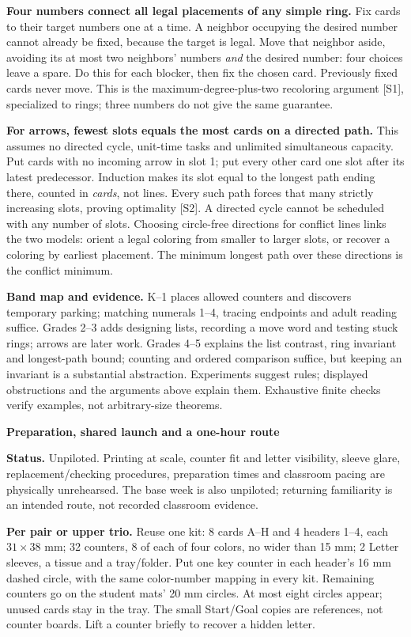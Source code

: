 \documentclass[10pt]{article}
\newcommand{\head}[1]{\par{\large\bfseries #1}\par}
\begin{document}
\textbf{Four numbers connect all legal placements of any simple ring.} Fix cards to their target numbers one at a time. A neighbor occupying the desired number cannot already be fixed, because the target is legal. Move that neighbor aside, avoiding its at most two neighbors' numbers \emph{and} the desired number: four choices leave a spare. Do this for each blocker, then fix the chosen card. Previously fixed cards never move. This is the maximum-degree-plus-two recoloring argument [S1], specialized to rings; three numbers do not give the same guarantee.

\textbf{For arrows, fewest slots equals the most cards on a directed path.} This assumes no directed cycle, unit-time tasks and unlimited simultaneous capacity. Put cards with no incoming arrow in slot 1; put every other card one slot after its latest predecessor. Induction makes its slot equal to the longest path ending there, counted in \emph{cards}, not lines. Every such path forces that many strictly increasing slots, proving optimality [S2]. A directed cycle cannot be scheduled with any number of slots. Choosing circle-free directions for conflict lines links the two models: orient a legal coloring from smaller to larger slots, or recover a coloring by earliest placement. The minimum longest path over these directions is the conflict minimum.

\textbf{Band map and evidence.} K--1 places allowed counters and discovers temporary parking; matching numerals 1--4, tracing endpoints and adult reading suffice. Grades 2--3 adds designing lists, recording a move word and testing stuck rings; arrows are later work. Grades 4--5 explains the list contrast, ring invariant and longest-path bound; counting and ordered comparison suffice, but keeping an invariant is a substantial abstraction. Experiments suggest rules; displayed obstructions and the arguments above explain them. Exhaustive finite checks verify examples, not arbitrary-size theorems.
\newpage
\head{Preparation, shared launch and a one-hour route}
\textbf{Status.} Unpiloted. Printing at scale, counter fit and letter visibility, sleeve glare, replacement/checking procedures, preparation times and classroom pacing are physically unrehearsed. The base week is also unpiloted; returning familiarity is an intended route, not recorded classroom evidence.

\textbf{Per pair or upper trio.} Reuse one kit: 8 cards A--H and 4 headers 1--4, each $31\times38$ mm; 32 counters, 8 of each of four colors, no wider than 15 mm; 2 Letter sleeves, a tissue and a tray/folder. Put one key counter in each header's 16 mm dashed circle, with the same color-number mapping in every kit. Remaining counters go on the student mats' 20 mm circles. At most eight circles appear; unused cards stay in the tray. The small Start/Goal copies are references, not counter boards. Lift a counter briefly to recover a hidden letter.
\end{document}
